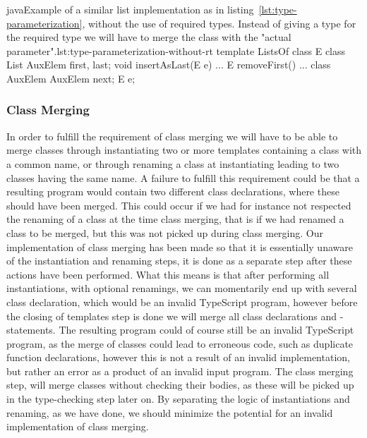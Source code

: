\begin{code}{java}{Example of a similar list implementation as in listing~\vref{lst:type-parameterization}, without the use of required types. Instead of giving a type for the required type we will have to merge the class  with the "actual parameter".}{lst:type-parameterization-without-rt}
    template ListsOf {
        class E { }
        class List {
            AuxElem first, last;
            void insertAsLast(E e) { ... }
            E removeFirst() { ... }
        }
        class AuxElem {
            AuxElem next;
            E e;
        }
    }
\end{code}

\subsubsection{Class Merging}\label{subsubsec:pts-class-merging}


In order to fulfill the requirement of class merging we will have to be able to merge classes through instantiating two or more templates containing a class with a common name, or through renaming a class at instantiating leading to two classes having the same name.
A failure to fulfill this requirement could be that a resulting program would contain two different class declarations, where these should have been merged.
This could occur if we had for instance not respected the renaming of a class at the time class merging, that is if we had renamed a class to be merged, but this was not picked up during class merging.
Our implementation of class merging has been made so that it is essentially unaware of the instantiation and renaming steps, it is done as a separate step after these actions have been performed.
What this means is that after performing all instantiations, with optional renamings, we can momentarily end up with several class declaration, which would be an invalid TypeScript program, however before the closing of templates step is done we will merge all class declarations and -statements.
The resulting program could of course still be an invalid TypeScript program, as the merge of classes could lead to erroneous code, such as duplicate function declarations, however this is not a result of an invalid implementation, but rather an error as a product of an invalid input program.
The class merging step, will merge classes without checking their bodies, as these will be picked up in the type-checking step later on.
By separating the logic of instantiations and renaming, as we have done, we should minimize the potential for an invalid implementation of class merging.

